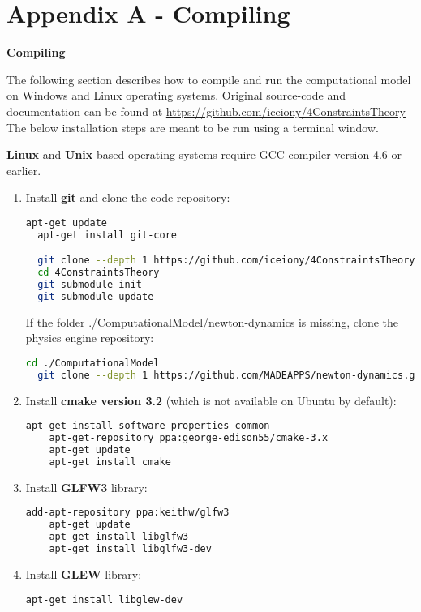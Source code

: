 \documentclass[11]{article}
\let \shorttitle \textbf
\begin{document}
\section{Appendix A - Compiling}
\shorttitle{Compiling}

The following section describes how to compile and run the computational model on Windows and Linux operating systems. 
Original source-code and documentation can be found at \url{https://github.com/iceiony/4ConstraintsTheory}
The below installation steps are meant to be run using a terminal window.

\textbf{Linux} and \textbf{Unix} based operating systems require GCC compiler version 4.6 or earlier. 
\begin{enumerate}
  \item Install \textbf{git} and clone the code repository: 
    \begin{lstlisting}[language=bash]
  apt-get update
  apt-get install git-core

  git clone --depth 1 https://github.com/iceiony/4ConstraintsTheory.git 
  cd 4ConstraintsTheory
  git submodule init
  git submodule update
    \end{lstlisting}

    If the folder ./ComputationalModel/newton-dynamics is missing, clone the physics engine repository:
    \begin{lstlisting}[language=bash]
  cd ./ComputationalModel
  git clone --depth 1 https://github.com/MADEAPPS/newton-dynamics.git 
    \end{lstlisting}

  \item Install \textbf{cmake version 3.2} (which is not available on Ubuntu by default): 
    \begin{lstlisting}[language=bash]
    apt-get install software-properties-common
    apt-get-repository ppa:george-edison55/cmake-3.x
    apt-get update
    apt-get install cmake
    \end{lstlisting}

  \item Install \textbf{GLFW3} library:
    \begin{lstlisting}[language=bash]
    add-apt-repository ppa:keithw/glfw3
    apt-get update
    apt-get install libglfw3
    apt-get install libglfw3-dev
    \end{lstlisting}

  \item Install \textbf{GLEW} library:
    \begin{lstlisting}[language=bash]
    apt-get install libglew-dev
    \end{lstlisting}
    


\end{enumerate}
\end{document}
